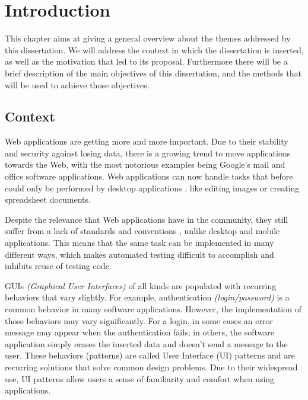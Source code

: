 \chapter{Introduction} \label{chap:intro}


This chapter aims at giving a general overview about the themes addressed by this dissertation. We will address the context in which the dissertation is inserted, as well as the motivation that led to its proposal. Furthermore there will be a brief description of the main objectives of this dissertation, and the methods that will be used to achieve those objectives.

\section{Context} \label{sec:context}

Web applications are getting more and more important. Due to their stability and security against losing data, there is a growing trend to move applications towards the Web, with the most notorious examples being Google's mail and office software applications. Web applications can now handle tasks that before could only be performed by desktop applications \cite{garrett2005ajax}, like editing images or creating spreadsheet documents.

Despite the relevance that Web applications have in the community, they still suffer from a lack of standards and conventions \cite{constantine2002usage}, unlike desktop and mobile applications. This means that the same task can be implemented in many different ways, which makes automated testing difficult to accomplish and inhibits reuse of testing code.

GUIs \textit{(Graphical User Interfaces)} of all kinds are populated with recurring behaviors that vary slightly. For example, authentication \textit{(login/password)} is a common behavior in many software applications. However, the implementation of those behaviors may vary significantly. For a login, in some cases an error message may appear when the authentication fails; in others, the software application simply erases the inserted data and doesn't send a message to the user. These behaviors (patterns) are called User Interface (UI) patterns \cite{van2001patterns} and are recurring solutions that solve common design problems. Due to their widespread use, UI patterns allow users a sense of familiarity and comfort when using applications.

